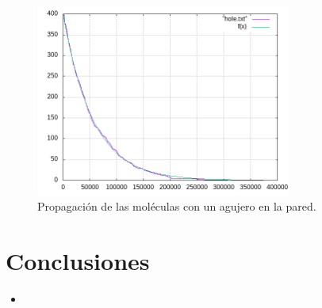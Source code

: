 \documentclass[12pt,twocolumn]{article}
\begin{document}
\begin{figure}
    \centering
    \includegraphics[width=0.75\textwidth]{figs/hole.png}
    \caption{Propagación de las moléculas con un agujero en la pared.}
    \label{fig:hole}
\end{figure}

\section{Conclusiones}
\begin{itemize}
    \item 
\end{itemize}
\end{document}
